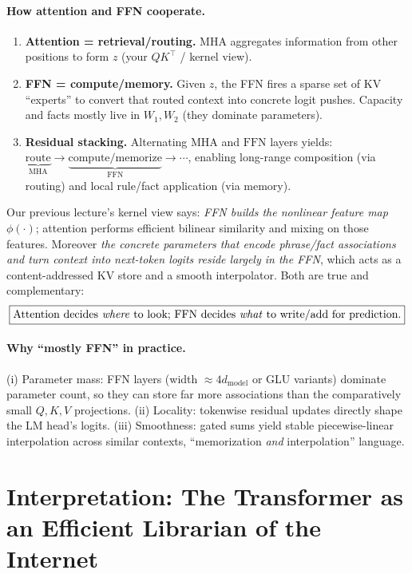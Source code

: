 \documentclass{article}
\begin{document}
\paragraph{How attention and FFN cooperate.}
\begin{enumerate}[leftmargin=1.2em]
\item \textbf{Attention = retrieval/routing.} MHA aggregates information from other positions to form $z$ (your $Q\!K^\top$ / kernel view).
\item \textbf{FFN = compute/memory.} Given $z$, the FFN fires a sparse set of KV “experts” to convert that routed context into concrete logit pushes. Capacity and facts mostly live in $W_1,W_2$ (they dominate parameters).
\item \textbf{Residual stacking.} Alternating \(\text{MHA}\) and \(\text{FFN}\) layers yields: \(\underbrace{\text{route}}_{\text{MHA}}\rightarrow\underbrace{\text{compute/memorize}}_{\text{FFN}}\rightarrow\cdots\), enabling long-range composition (via routing) and local rule/fact application (via memory).
\end{enumerate}


Our previous lecture’s kernel view says: \emph{FFN builds the nonlinear feature map} \(\phi(\cdot)\); attention performs efficient bilinear similarity and mixing on those features. Moreover \emph{the concrete parameters that encode phrase/fact associations and turn context into next-token logits reside largely in the FFN}, which acts as a content-addressed KV store and a smooth interpolator. Both are true and complementary:
\[
\boxed{\text{Attention decides \emph{where} to look; FFN decides \emph{what} to write/add for prediction.}}
\]

\paragraph{Why ``mostly FFN'' in practice.}
(i) Parameter mass: FFN layers (width $\approx 4d_{\mathrm{model}}$ or GLU variants) dominate parameter count, so they can store far more associations than the comparatively small $Q,K,V$ projections. (ii) Locality: tokenwise residual updates directly shape the LM head’s logits. (iii) Smoothness: gated sums yield stable piecewise-linear interpolation across similar contexts, “memorization \emph{and} interpolation” language.

\section{Interpretation: The Transformer as an Efficient Librarian of the Internet}
\end{document}
